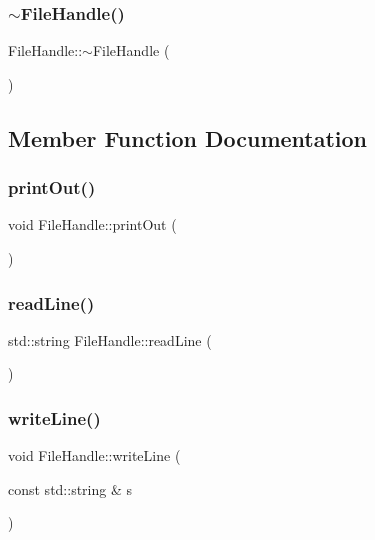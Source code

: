 \mbox{\label{classFileHandle_a82b120a28b10d0637d84e490fbc9836a}} 
\subsubsection{\texorpdfstring{$\sim$FileHandle()}{~FileHandle()}}
{\footnotesize\ttfamily File\+Handle\+::$\sim$\+File\+Handle (\begin{DoxyParamCaption}{ }\end{DoxyParamCaption})}



\subsection{Member Function Documentation}
\mbox{\label{classFileHandle_a363a46ef01ba33c2c51b9438f88929cd}} 
\subsubsection{\texorpdfstring{printOut()}{printOut()}}
{\footnotesize\ttfamily void File\+Handle\+::print\+Out (\begin{DoxyParamCaption}{ }\end{DoxyParamCaption})}

\mbox{\label{classFileHandle_ad54fc998e0384881f2658208d5c6c81d}} 
\subsubsection{\texorpdfstring{readLine()}{readLine()}}
{\footnotesize\ttfamily std\+::string File\+Handle\+::read\+Line (\begin{DoxyParamCaption}{ }\end{DoxyParamCaption})}

\mbox{\label{classFileHandle_a73927a95279e6d2ef89e4bf04b705c6f}} 
\subsubsection{\texorpdfstring{writeLine()}{writeLine()}\hspace{0.1cm}{\footnotesize\ttfamily [1/2]}}
{\footnotesize\ttfamily void File\+Handle\+::write\+Line (\begin{DoxyParamCaption}\item[{const std\+::string \&}]{s }\end{DoxyParamCaption})}


